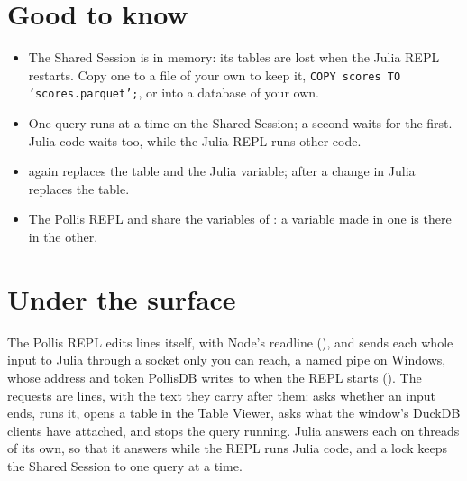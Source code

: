 \section{Good to know}\label{sec:know}
\begin{itemize}
  \item The Shared Session is in memory: its tables are lost when the Julia REPL restarts. Copy one to a file of your
    own to keep it, \texttt{\small COPY scores TO 'scores.parquet';}, or into a database of your own.
  \item One query runs at a time on the Shared Session; a second waits for the first. Julia code waits too, while the
    Julia REPL runs other code.
  \item {} again replaces the table and the Julia variable;  after a change in
    Julia replaces the table.
  \item The Pollis REPL and  share the variables of : a variable made in one is there in the
    other.
\end{itemize}

\section{Under the surface}\label{sec:machinery}
The Pollis REPL edits lines itself, with Node's readline (),
and sends each whole input to Julia through a socket only you can reach, a named pipe on Windows, whose address and
token PollisDB writes to  when the REPL starts
(). The requests are lines, with the text they carry after them:  asks
whether an input ends,  runs it,  opens a table in the Table Viewer,  asks what
the window's DuckDB clients have attached, and  stops the query running. Julia answers each on threads
of its own, so that it answers while the REPL runs Julia code, and a lock keeps the Shared Session to one query at a
time.

